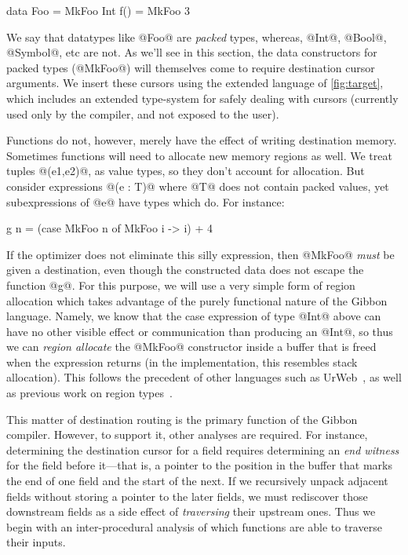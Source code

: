 \documentclass[a4paper,english]{lipics-v2016}
\newcommand{\treelang}{Gibbon\xspace} %
\newif\ifcurly
\newcommand{\finishmecurly}{\ifcurly \Red{FINISHME - do ifcurly version here} \else}
\begin{document}
\finishmecurly
\begin{code}
  data Foo = MkFoo Int
  f() = MkFoo 3
\end{code}
\fi

We say that datatypes like @Foo@ are {\em packed} types, whereas, @Int@, @Bool@,
@Symbol@, etc are not.  As we'll see in this section, the data constructors for
packed types (@MkFoo@) will themselves come to require destination cursor arguments.
%
We insert these cursors using the extended language of \cref{fig:target}, which
includes an extended type-system for safely dealing with cursors (currently used
only by the compiler, and not exposed to the user).

Functions do not, however, merely have the effect of writing destination memory.
Sometimes functions will need to allocate new memory regions as well.  We treat
tuples @(e1,e2)@, as value types, so they don't account for allocation.  But
consider expressions @(e : T)@ where @T@ does not contain packed values, yet
subexpressions of @e@ have types which do.  For instance:

\finishmecurly
\begin{code}
  g n = (case MkFoo n of MkFoo i -> i) + 4
\end{code}
\fi

If the optimizer does not eliminate this silly expression, then @MkFoo@ {\em
  must} be given a destination, even though the constructed data does not escape
the function @g@.  For this purpose, we will use a very simple form of region
allocation which takes advantage of the purely functional nature of the
\treelang language.  Namely, we know that the case expression of type @Int@
above can have no other visible effect or communication than producing an @Int@,
so thus we can {\em region allocate} the @MkFoo@ constructor inside a buffer
that is freed when the expression returns (in the implementation, this resembles
stack allocation).  This follows the precedent of other languages such as
UrWeb~\cite{urweb}, as well as previous work on region
types~\cite{mlkit,cyclone}.


This matter of destination routing is the primary function of the \treelang
compiler.  However, to support it, other analyses are required.  For instance,
determining the destination cursor for a field requires determining an {\em end
  witness} for the field before it---that is, a pointer to the position in the
buffer that marks the end of one field and the start of the next.  If we
recursively unpack adjacent fields without storing a pointer to the later
fields, we must rediscover those downstream fields as a side effect of
{\em traversing} their upstream ones.  Thus we begin with an inter-procedural
analysis of which functions are able to traverse their inputs.
\end{document}
